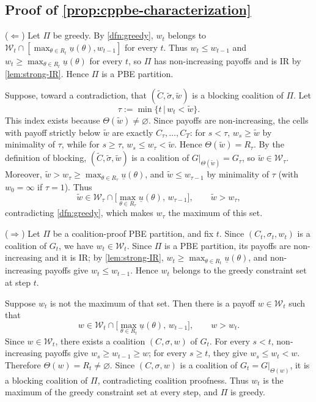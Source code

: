 \documentclass[11pt]{article}
\newcommand{\sep}{\,|\,}
\newcommand{\W}{\mathcal{W}}
\begin{document}
\subsection*{Proof of \cref{prop:cppbe-characterization}}
($\Leftarrow$) Let $\Pi$ be greedy. By \cref{dfn:greedy}, $w_t$ belongs to $\W_t\cap[\max_{\theta\in R_t}\underline{u}(\theta),w_{t-1}]$ for every $t$. Thus $w_t\leq w_{t-1}$ and $w_t\geq\max_{\theta\in R_t}\underline{u}(\theta)$ for every $t$, so $\Pi$ has non-increasing payoffs and is IR by \cref{lem:strong-IR}. Hence $\Pi$ is a PBE partition.

Suppose, toward a contradiction, that $(\widetilde C,\widetilde\sigma,\widetilde w)$ is a blocking coalition of $\Pi$. Let
\[
    \tau:=\min\{t\sep w_t<\widetilde w\}.
\]
This index exists because $\Theta(\widetilde w)\neq\varnothing$. Since payoffs are non-increasing, the cells with payoff strictly below $\widetilde w$ are exactly $C_\tau,\ldots,C_T$: for $s<\tau$, $w_s\geq\widetilde w$ by minimality of $\tau$, while for $s\geq\tau$, $w_s\leq w_\tau<\widetilde w$. Hence $\Theta(\widetilde w)=R_\tau$. By the definition of blocking, $(\widetilde C,\widetilde\sigma,\widetilde w)$ is a coalition of $G\vert_{\Theta(\widetilde w)}=G_\tau$, so $\widetilde w\in\W_\tau$. Moreover, $\widetilde w>w_\tau\geq\max_{\theta\in R_\tau}\underline{u}(\theta)$, and $\widetilde w\leq w_{\tau-1}$ by minimality of $\tau$ (with $w_0=\infty$ if $\tau=1$). Thus
\[
    \widetilde w
    \in
    \W_\tau
    \cap
    \bigl[
        \max_{\theta\in R_\tau}\underline{u}(\theta),\,
        w_{\tau-1}
    \bigr],
    \qquad
    \widetilde w>w_\tau,
\]
contradicting \cref{dfn:greedy}, which makes $w_\tau$ the maximum of this set.

($\Rightarrow$) Let $\Pi$ be a coalition-proof PBE partition, and fix $t$. Since $(C_t,\sigma_t,w_t)$ is a coalition of $G_t$, we have $w_t\in\W_t$. Since $\Pi$ is a PBE partition, its payoffs are non-increasing and it is IR; by \cref{lem:strong-IR}, $w_t\geq\max_{\theta\in R_t}\underline{u}(\theta)$, and non-increasing payoffs give $w_t\leq w_{t-1}$. Hence $w_t$ belongs to the greedy constraint set at step $t$.

Suppose $w_t$ is not the maximum of that set. Then there is a payoff $w\in\W_t$ such that
\[
    w
    \in
    \W_t
    \cap
    \bigl[
        \max_{\theta\in R_t}\underline{u}(\theta),\,
        w_{t-1}
    \bigr],
    \qquad
    w>w_t.
\]
Since $w\in\W_t$, there exists a coalition $(C,\sigma,w)$ of $G_t$. For every $s<t$, non-increasing payoffs give $w_s\geq w_{t-1}\geq w$; for every $s\geq t$, they give $w_s\leq w_t<w$. Therefore $\Theta(w)=R_t\neq\varnothing$. Since $(C,\sigma,w)$ is a coalition of $G_t=G\vert_{\Theta(w)}$, it is a blocking coalition of $\Pi$, contradicting coalition proofness. Thus $w_t$ is the maximum of the greedy constraint set at every step, and $\Pi$ is greedy.
\end{document}
